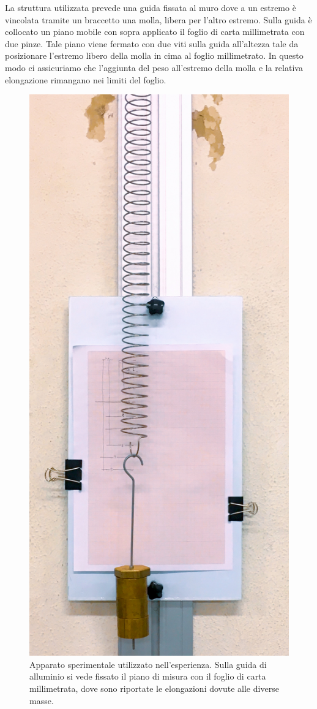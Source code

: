 \documentclass[italian, a4paper, 10pt, twocolumn]{../../style/lab_unige}
\begin{document}
    La struttura utilizzata prevede una guida fissata al muro dove a un estremo è vincolata tramite un braccetto 
    una molla, libera per l'altro estremo. Sulla guida è collocato un piano mobile con sopra applicato il foglio 
    di carta millimetrata con due pinze. Tale piano viene fermato con due viti sulla guida all'altezza tale da
    posizionare l'estremo libero della molla in cima al foglio millimetrato. In questo modo ci assicuriamo che 
    l'aggiunta del peso all'estremo della molla e la relativa elongazione rimangano nei limiti del foglio.

    \begin{figure}[h!]
        \centering
        \includegraphics[width=0.72\linewidth]{IMG_0242.JPG}
        \caption{Apparato sperimentale utilizzato nell'esperienza. Sulla guida di alluminio si vede fissato il
        piano di misura con il foglio di carta millimetrata, dove sono riportate le elongazioni dovute alle 
        diverse masse.}
        \label{figure:apparatus}
    \end{figure}
\end{document}
